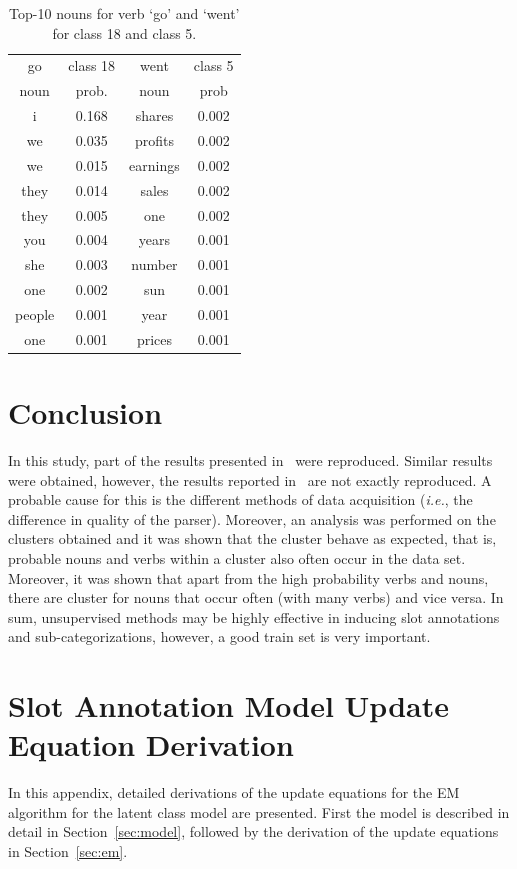 \documentclass[11pt]{scrartcl}
\newcommand{\ie}{\textit{i.e.}}
\begin{document}
  \begin{table}
    \centering
\begin{tabular}{c c c c}
\toprule
go & class 18 & went & class 5 \\
noun & prob. & noun & prob \\
\midrule
i & 0.168        & shares & 0.002 \\
we & 0.035       & profits & 0.002 \\
we & 0.015       & earnings & 0.002 \\
they & 0.014     & sales & 0.002 \\
they & 0.005     & one & 0.002 \\
you & 0.004      & years & 0.001 \\
she & 0.003      & number & 0.001 \\
one & 0.002      & sun & 0.001 \\
people & 0.001   & year & 0.001 \\
one & 0.001      & prices & 0.001 \\
\bottomrule
\end{tabular}
\caption{Top-10 nouns for verb `go' and `went' for class 18 and class 5.}
\label{table:topnoun}
\end{table}

\section{Conclusion} %
In this study, part of the results presented
in~\cite{rooth1999inducing} were reproduced. Similar results were
obtained, however, the results reported in~\cite{rooth1999inducing}
are not exactly reproduced. A probable cause for this is the different
methods of data acquisition (\ie, the difference in quality of the
parser). Moreover, an analysis was performed on the clusters obtained
and it was shown that the cluster behave as expected, that is,
probable nouns and verbs within a cluster also often occur in the data
set. Moreover, it was shown that apart from the high probability verbs
and nouns, there are cluster for nouns that occur often (with many
verbs) and vice versa. In sum, unsupervised methods may be highly
effective in inducing slot annotations and sub-categorizations,
however, a good train set is very important.




\onecolumn
\appendix
\section{Slot Annotation Model Update Equation Derivation}
\label{sec:part1}
In this appendix, detailed derivations of the update equations for the
EM algorithm for the latent class model are presented. First the model
is described in detail in Section~\ref{sec:model}, followed by the
derivation of the update equations in Section~\ref{sec:em}.
\end{document}
